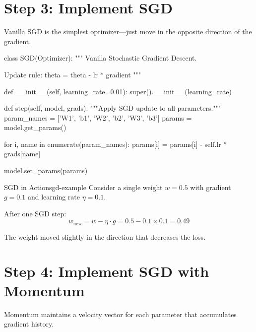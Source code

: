 \documentclass[../../main.tex]{subfiles}
\begin{document}
\section{Step 3: Implement SGD}
\label{sec:capstone-sgd}

Vanilla SGD is the simplest optimizer---just move in the opposite direction of the gradient.

\begin{pythoncode}
class SGD(Optimizer):
    """
    Vanilla Stochastic Gradient Descent.

    Update rule: theta = theta - lr * gradient
    """

    def __init__(self, learning_rate=0.01):
        super().__init__(learning_rate)

    def step(self, model, grads):
        """Apply SGD update to all parameters."""
        param_names = ['W1', 'b1', 'W2', 'b2', 'W3', 'b3']
        params = model.get_params()

        for i, name in enumerate(param_names):
            params[i] = params[i] - self.lr * grads[name]

        model.set_params(params)
\end{pythoncode}

\begin{example}{SGD in Action}{sgd-example}
Consider a single weight $w = 0.5$ with gradient $g = 0.1$ and learning rate $\eta = 0.1$.

After one SGD step:
\[
    w_{\text{new}} = w - \eta \cdot g = 0.5 - 0.1 \times 0.1 = 0.49
\]

The weight moved slightly in the direction that decreases the loss.
\end{example}

\section{Step 4: Implement SGD with Momentum}
\label{sec:capstone-momentum}

Momentum maintains a velocity vector for each parameter that accumulates gradient history.
\end{document}
